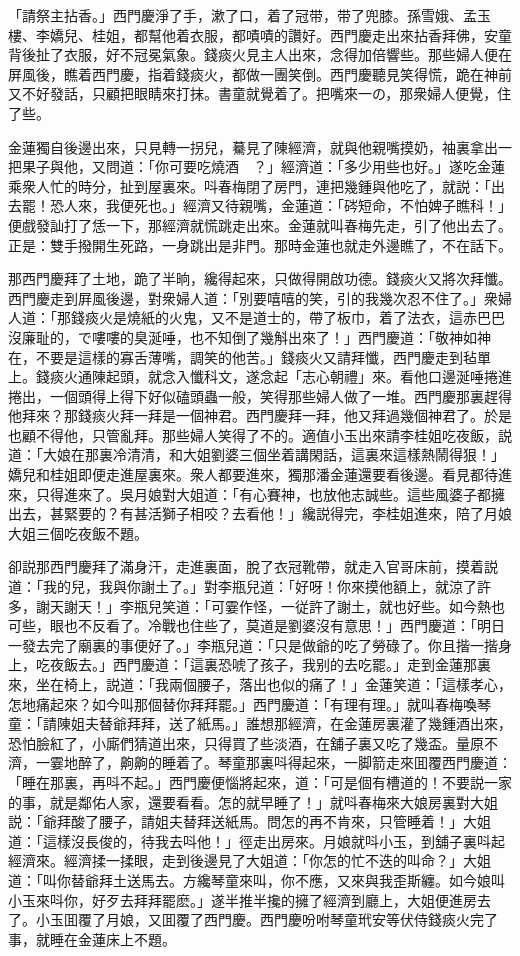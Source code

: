 「請祭主拈香。」西門慶淨了手，漱了口，着了冠带，带了兜膝。孫雪娥、孟玉樓、李嬌兒、桂姐，都幫他着衣服，都嘖嘖的讚好。西門慶走出來拈香拜佛，安童背後扯了衣服，好不冠冕氣象。錢痰火見主人出來，念得加倍響些。那些婦人便在屏風後，瞧着西門慶，指着錢痰火，都做一團笑倒。西門慶聽見笑得慌，跪在神前又不好發話，只顧把眼睛來打抹。書童就覺着了。把嘴來一の，那衆婦人便覺，住了些。

金蓮獨自後邊出來，只見轉一拐兒，驀見了陳經濟，就與他親嘴摸奶，袖裏拿出一把果子與他，又問道：「你可要吃燒酒　？」經濟道：「多少用些也好。」遂吃金蓮乘衆人忙的時分，扯到屋裏來。呌春梅閉了房門，連把幾鍾與他吃了，就説：「出去罷！恐人來，我便死也。」經濟又待親嘴，金蓮道：「硶短命，不怕婢子瞧科！」便戲發訕打了恁一下，那經濟就慌跳走出來。金蓮就叫春梅先走，引了他出去了。正是：雙手撥開生死路，一身跳出是非門。那時金蓮也就走外邊瞧了，不在話下。

那西門慶拜了土地，跪了半晌，纔得起來，只做得開啟功德。錢痰火又將次拜懺。西門慶走到屛風後邊，對衆婦人道：「別要嘻嘻的笑，引的我幾次忍不住了。」衆婦人道：「那錢痰火是燒紙的火鬼，又不是道士的，帶了板巾，着了法衣，這赤巴巴沒廉耻的，で嘍嘍的臭涎唾，也不知倒了幾斛出來了！」西門慶道：「敬神如神在，不要是這樣的寡舌薄嘴，調笑的他苦。」錢痰火又請拜懺，西門慶走到毡單上。錢痰火通陳起頭，就念入懺科文，遂念起「志心朝禮」來。看他口邊涎唾捲進捲出，一個頭得上得下好似磕頭蟲一般，笑得那些婦人做了一堆。西門慶那裏趕得他拜來？那錢痰火拜一拜是一個神君。西門慶拜一拜，他又拜過幾個神君了。於是也顧不得他，只管亂拜。那些婦人笑得了不的。適值小玉出來請李桂姐吃夜飯，説道：「大娘在那裏冷清清，和大姐劉婆三個坐着講閑話，這裏來這樣熱鬧得狠！」嬌兒和桂姐即便走進屋裏來。衆人都要進來，獨那潘金蓮還要看後邊。看見都待進來，只得進來了。吳月娘對大姐道：「有心賽神，也放他志誠些。這些風婆子都擁出去，甚緊要的？有甚活獅子相咬？去看他！」纔説得完，李桂姐進來，陪了月娘大姐三個吃夜飯不題。

卻説那西門慶拜了滿身汗，走進裏面，脫了衣冠靴帶，就走入官哥床前，摸着説道：「我的兒，我與你謝土了。」對李瓶兒道：「好呀！你來摸他額上，就涼了許多，謝天謝天！」李瓶兒笑道：「可霎作怪，一従許了謝土，就也好些。如今熱也可些，眼也不反看了。冷戰也住些了，莫道是劉婆沒有意思！」西門慶道：「明日一發去完了廟裏的事便好了。」李瓶兒道：「只是做爺的吃了勞碌了。你且揩一揩身上，吃夜飯去。」西門慶道：「這裏恐唬了孩子，我别的去吃罷。」走到金蓮那裏來，坐在椅上，説道：「我兩個腰子，落出也似的痛了！」金蓮笑道：「這樣孝心，怎地痛起來？如今叫那個替你拜拜罷。」西門慶道：「有理有理。」就叫春梅喚琴童：「請陳姐夫替爺拜拜，送了紙馬。」誰想那經濟，在金蓮房裏灌了幾鍾酒出來，恐怕臉紅了，小廝們猜道出來，只得買了些淡酒，在舖子裏又吃了幾盃。量原不濟，一霎地醉了，齁齁的睡着了。琴童那裏呌得起來，一脚箭走來囬覆西門慶道：「睡在那裏，再呌不起。」西門慶便惱將起來，道：「可是個有槽道的！不要説一家的事，就是鄰佑人家，還要看看。怎的就早睡了！」就呌春梅來大娘房裏對大姐説：「爺拜酸了腰子，請姐夫替拜送紙馬。問怎的再不肯來，只管睡着！」大姐道：「這樣沒長俊的，待我去呌他！」徑走出房來。月娘就呌小玉，到舖子裏呌起經濟來。經濟揉一揉眼，走到後邊見了大姐道：「你怎的忙不迭的叫命？」大姐道：「叫你替爺拜土送馬去。方纔琴童來叫，你不應，又來與我歪斯纏。如今娘叫小玉來呌你，好歹去拜拜罷麽。」遂半推半攙的擁了經濟到廳上，大姐便進房去了。小玉囬覆了月娘，又囬覆了西門慶。西門慶吩咐琴童玳安等伏侍錢痰火完了事，就睡在金蓮床上不題。


